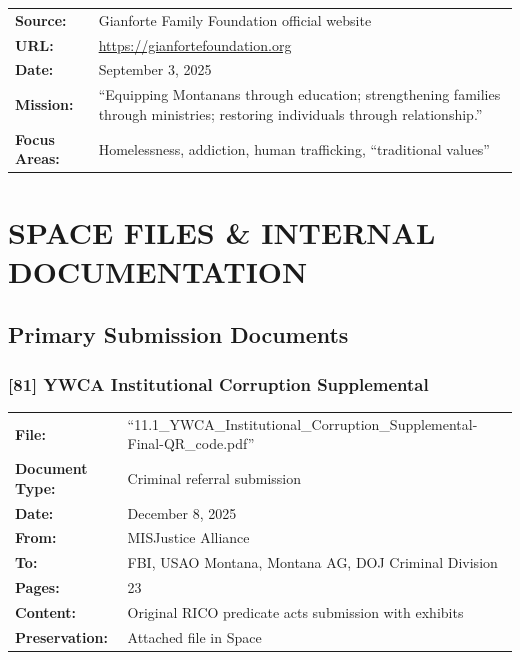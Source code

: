 \documentclass[11pt,letterpaper]{article}
\newcommand{\citeref}[1]{\textbf{\color{NavyBlue}[#1]}}
\begin{document}
\begin{tabular}{@{}p{1.4in}p{4.6in}@{}}
\textbf{Source:} & Gianforte Family Foundation official website\\
\textbf{URL:} & \url{https://gianfortefoundation.org}\\
\textbf{Date:} & September 3, 2025\\
\textbf{Mission:} & ``Equipping Montanans through education; strengthening families through ministries; restoring individuals through relationship.''\\
\textbf{Focus Areas:} & Homelessness, addiction, human trafficking, ``traditional values''\\
\end{tabular}

\newpage

\section{SPACE FILES \& INTERNAL DOCUMENTATION}

\subsection{Primary Submission Documents}

\subsubsection{\citeref{81} YWCA Institutional Corruption Supplemental}

\begin{tabular}{@{}p{1.4in}p{4.6in}@{}}
\textbf{File:} & ``11.1\_YWCA\_Institutional\_Corruption\_Supplemental-Final-QR\_code.pdf''\\
\textbf{Document Type:} & Criminal referral submission\\
\textbf{Date:} & December 8, 2025\\
\textbf{From:} & MISJustice Alliance\\
\textbf{To:} & FBI, USAO Montana, Montana AG, DOJ Criminal Division\\
\textbf{Pages:} & 23\\
\textbf{Content:} & Original RICO predicate acts submission with exhibits\\
\textbf{Preservation:} & Attached file in Space\\
\end{tabular}

\vspace{0.1in}
\end{document}
